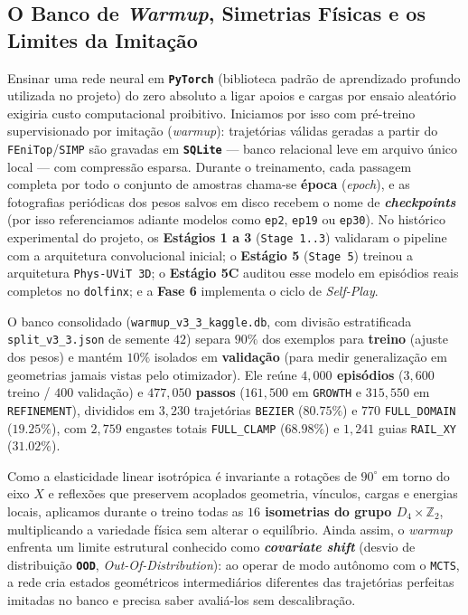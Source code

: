 \documentclass[11pt,a4paper]{article}
\begin{document}
\subsection{O Banco de \emph{Warmup}, Simetrias Físicas e os Limites da Imitação}

Ensinar uma rede neural em \textbf{\texttt{PyTorch}} (biblioteca padrão de aprendizado profundo utilizada no projeto) do zero absoluto a ligar apoios e cargas por ensaio aleatório exigiria custo computacional proibitivo. Iniciamos por isso com pré-treino supervisionado por imitação (\emph{warmup}): trajetórias válidas geradas a partir do \texttt{FEniTop}/\texttt{SIMP} são gravadas em \textbf{\texttt{SQLite}} — banco relacional leve em arquivo único local — com compressão esparsa. Durante o treinamento, cada passagem completa por todo o conjunto de amostras chama-se \textbf{época} (\emph{epoch}), e as fotografias periódicas dos pesos salvos em disco recebem o nome de \textbf{\emph{checkpoints}} (por isso referenciamos adiante modelos como \texttt{ep2}, \texttt{ep19} ou \texttt{ep30}). No histórico experimental do projeto, os \textbf{Estágios 1 a 3} (\texttt{Stage 1..3}) validaram o pipeline com a arquitetura convolucional inicial; o \textbf{Estágio 5} (\texttt{Stage 5}) treinou a arquitetura \texttt{Phys-UViT 3D}; o \textbf{Estágio 5C} auditou esse modelo em episódios reais completos no \texttt{dolfinx}; e a \textbf{Fase 6} implementa o ciclo de \emph{Self-Play}.

O banco consolidado (\texttt{warmup\_v3\_3\_kaggle.db}, com divisão estratificada \texttt{split\_v3\_3.json} de semente $42$) separa $90\%$ dos exemplos para \textbf{treino} (ajuste dos pesos) e mantém $10\%$ isolados em \textbf{validação} (para medir generalização em geometrias jamais vistas pelo otimizador). Ele reúne \textbf{$4{,}000$ episódios} ($3{,}600$ treino / $400$ validação) e \textbf{$477{,}050$ passos} ($161{,}500$ em \texttt{GROWTH} e $315{,}550$ em \texttt{REFINEMENT}), divididos em $3{,}230$ trajetórias \texttt{BEZIER} ($80.75\%$) e $770$ \texttt{FULL\_DOMAIN} ($19.25\%$), com $2{,}759$ engastes totais \texttt{FULL\_CLAMP} ($68.98\%$) e $1{,}241$ guias \texttt{RAIL\_XY} ($31.02\%$).

Como a elasticidade linear isotrópica é invariante a rotações de $90^\circ$ em torno do eixo $X$ e reflexões que preservem acoplados geometria, vínculos, cargas e energias locais, aplicamos durante o treino todas as \textbf{$16$ isometrias do grupo $D_4 \times \mathbb{Z}_2$}, multiplicando a variedade física sem alterar o equilíbrio. Ainda assim, o \emph{warmup} enfrenta um limite estrutural conhecido como \textbf{\emph{covariate shift}} (desvio de distribuição \textbf{\texttt{OOD}}, \emph{Out-Of-Distribution}): ao operar de modo autônomo com o \texttt{MCTS}, a rede cria estados geométricos intermediários diferentes das trajetórias perfeitas imitadas no banco e precisa saber avaliá-los sem descalibração.
\end{document}
